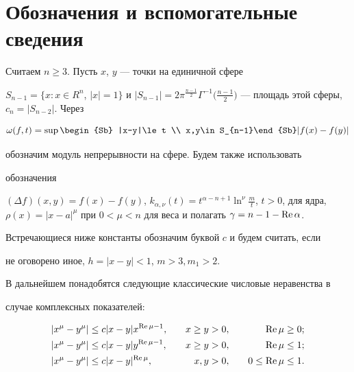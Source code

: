\section{Обозначения и вспомогательные сведения}





Считаем $n \ge 3$. Пусть $x$, $y$ --- точки на единичной сфере


$S_{n-1}=\{x: x\in R^n$, $|x|=1\}$ и $|S_{n-1}|=2\pi^{\frac{n-1}{2}}


\Gamma^{-1}\big(\frac{n-1}{2}\big)$ --- площадь этой сферы, $c_n =|S_{n-


2}|$. Через


$$


\omega(f,t) = \sup\limits \begin{Sb} |x-y|\le t \\ x,y\in S_{n-1}\end{Sb}


|f(x) - f(y)|


$$


обозначим модуль непрерывности на сфере. Будем также использовать


обозначения


$(\Delta f)(x,y)=f(x)-f(y)$, $k_{\alpha,\nu}


(t)=t^{\alpha-n+1}\ln^\nu \frac{m}{t}$, $t>0$, для ядра, $\rho(x) = |x-


a|^\mu$ при $0 <\mu < n$ для веса и полагать $\gamma=n-1-\re\alpha$.


Встречающиеся ниже константы обозначим буквой $c$ и будем считать, если


не оговорено иное, $h=|x-y|<1$, $m>3, m_1>2$.





В дальнейшем понадобятся следующие классические числовые неравенства в


случае комплексных показателей:


\begin{alignat}{3}


|x^\mu-y^\mu| &\leq c |x-y| x^{\re \mu-1}, &\quad x \geq y &> 0,


&\quad \re \mu &\geq 0; \\


%


|x^\mu-y^\mu| &\leq c |x-y| y^{\re \mu-1}, &\quad x \geq y &> 0, &\quad \re


\mu &\leq 1; \\


%


|x^\mu-y^\mu| &\leq c |x-y|^{\re \mu}, &\quad x, y &> 0, &\quad 0 \le \re


\mu &\le 1.


\end{alignat}





